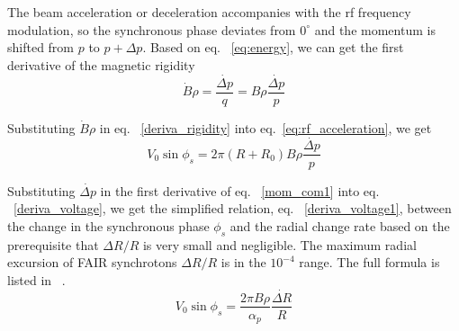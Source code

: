 \begin{itemize}
The beam acceleration or deceleration accompanies with the rf frequency modulation, so the synchronous phase deviates from $0^\circ$ and the momentum is shifted from $p$ to $p+\Delta p$. Based on eq. ~\ref{eq:energy}, we can get the first derivative of the magnetic rigidity
\begin{equation}
	\label{deriva_rigidity}
	\dot{B}\rho =\frac{\dot{\Delta p}}{q}=B\rho \dot{\frac{\Delta p}{p}}
\end{equation}

Substituting $\dot{B}\rho$ in eq. ~\ref{deriva_rigidity} into eq.~\ref{eq:rf_acceleration}, we get 
\begin{equation}
\label{deriva_voltage}
V_0\sin\phi_s=2\pi (R+R_0) B\rho \dot{\frac{\Delta p}{p}}
\end{equation} 

Substituting $\dot{\Delta p}$ in the first derivative of eq. ~\ref{mom_com1} into eq. ~\ref{deriva_voltage}, we get the simplified  relation, eq. ~\ref{deriva_voltage1}, between the change in the synchronous phase $\phi_{s}$ and the radial change rate based on the prerequisite that $\Delta R/R$ is very small and negligible. The maximum radial excursion of FAIR synchrotons $\Delta R/R$ is in the $10^{-4}$ range. The full formula is listed in ~\cite{ezura_beam-dynamics_2008}.
\begin{equation}
\label{deriva_voltage1}
V_0\sin\phi_s=\frac{2\pi B\rho}{\alpha_p} \dot{\frac{\Delta R}{R}}
\end{equation} 


\end{itemize}
